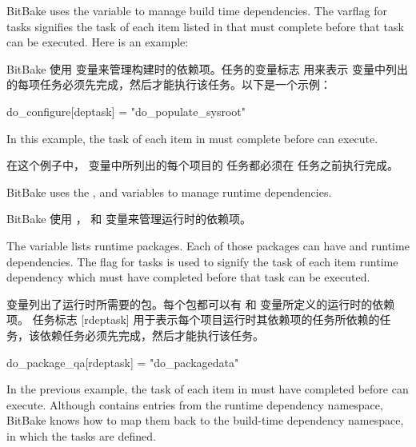\label{section:Build Dependencies}

BitBake uses the  variable to manage build time dependencies. The \code{[deptask]} varflag for tasks signifies the task of each item listed in  that must complete before that task can be executed. Here is an example:

BitBake 使用  变量来管理构建时的依赖项。任务的变量标志 \code{[deptask]} 用来表示  变量中列出的每项任务必须先完成，然后才能执行该任务。以下是一个示例：

\begin{pyglist}
do_configure[deptask] = "do_populate_sysroot"
\end{pyglist}

In this example, the  task of each item in  must complete before  can execute.

在这个例子中， 变量中所列出的每个项目的  任务都必须在  任务之前执行完成。

\label{section:Runtime Dependencies}
BitBake uses the ,  and  variables to manage runtime dependencies.

BitBake 使用 ， 和  变量来管理运行时的依赖项。

The  variable lists runtime packages. Each of those packages can have  and  runtime dependencies. The \code{[rdeptask]} flag for tasks is used to signify the task of each item runtime dependency which must have completed before that task can be executed.

 变量列出了运行时所需要的包。每个包都可以有  和  变量所定义的运行时的依赖项。 任务标志 [rdeptask] 用于表示每个项目运行时其依赖项的任务所依赖的任务，该依赖任务必须先完成，然后才能执行该任务。

\begin{pyglist}
do_package_qa[rdeptask] = "do_packagedata"
\end{pyglist}

In the previous example, the  task of each item in  must have completed before  can execute. Although  contains entries from the runtime dependency namespace, BitBake knows how to map them back to the build-time dependency namespace, in which the tasks are defined.

